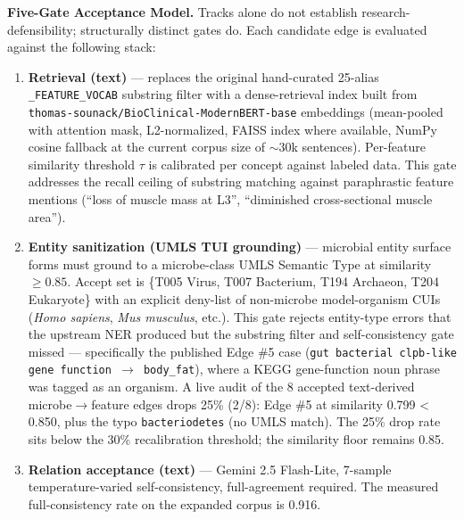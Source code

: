\documentclass[12pt, letterpaper]{article}
\begin{document}
\textbf{Five-Gate Acceptance Model.} Tracks alone do not establish research-defensibility; structurally distinct gates do. Each candidate edge is evaluated against the following stack:
\begin{enumerate}
    \item \textbf{Retrieval (text)} --- replaces the original hand-curated 25-alias \texttt{\_FEATURE\_VOCAB} substring filter with a dense-retrieval index built from \texttt{thomas-sounack/BioClinical-ModernBERT-base} embeddings (mean-pooled with attention mask, L2-normalized, FAISS index where available, NumPy cosine fallback at the current corpus size of $\sim$30k sentences). Per-feature similarity threshold $\tau$ is calibrated per concept against labeled data. This gate addresses the recall ceiling of substring matching against paraphrastic feature mentions (``loss of muscle mass at L3'', ``diminished cross-sectional muscle area'').
    \item \textbf{Entity sanitization (UMLS TUI grounding)} --- microbial entity surface forms must ground to a microbe-class UMLS Semantic Type at similarity $\geq 0.85$. Accept set is \{T005 Virus, T007 Bacterium, T194 Archaeon, T204 Eukaryote\} with an explicit deny-list of non-microbe model-organism CUIs (\textit{Homo sapiens}, \textit{Mus musculus}, etc.). This gate rejects entity-type errors that the upstream NER produced but the substring filter and self-consistency gate missed --- specifically the published Edge \#5 case (\texttt{gut bacterial clpb-like gene function $\to$ body\_fat}), where a KEGG gene-function noun phrase was tagged as an organism. A live audit of the 8 accepted text-derived microbe$\to$feature edges drops 25\% (2/8): Edge \#5 at similarity 0.799 < 0.850, plus the typo \texttt{bacteriodetes} (no UMLS match). The 25\% drop rate sits below the 30\% recalibration threshold; the similarity floor remains 0.85.
    \item \textbf{Relation acceptance (text)} --- Gemini 2.5 Flash-Lite, 7-sample temperature-varied self-consistency, full-agreement required. The measured full-consistency rate on the expanded corpus is 0.916.

\end{enumerate}
\end{document}

